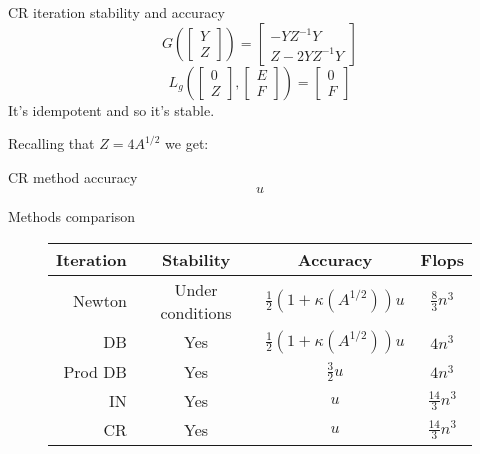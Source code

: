 \documentclass{beamer}
\theoremstyle{plain}
\theoremstyle{definition}
\theoremstyle{remark}
\newcommand{\pa}[1]{\left(#1\right)}
\newcommand{\bra}[1]{\left[#1\right]}
\begin{document}
\begin{frame}{CR iteration stability and accuracy}
  \[ G\pa{\bra{\begin{matrix}Y\\Z\end{matrix}}} = \bra{
      \begin{matrix}
        -YZ^{-1}Y  \\
        Z-2YZ^{-1}Y
      \end{matrix}} \]
  \[ L_g\pa{ \bra{ \begin{matrix}0\\Z\end{matrix}},
      \bra{\begin{matrix}E\\F\end{matrix}}} = \bra{\begin{matrix}0\\
        F \end{matrix}} \]
  It's idempotent and so it's stable. \vfill
  
  Recalling that $Z = 4A^{1/2}$ we get:
  \begin{block}{CR method accuracy}
    \[ u \]
  \end{block}
\end{frame}

\begin{frame}{Methods comparison}
  \begin{figure}
    \begin{tabular}{ r | c c >{\small}c }
      Iteration & Stability & Accuracy & Flops \\
      \hline
      Newton & Under conditions & $\frac{1}{2}\pa{1+ \kappa\pa{A^{1/2}}}u$ & $\frac{8}{3}n^3$ \\
      DB & Yes & $\frac{1}{2}\pa{1+ \kappa\pa{A^{1/2}}}u$ & $4n^3$ \\
      Prod DB & Yes & $\frac{3}{2}u$ & $4n^3$ \\
      IN & Yes & $u$ & $\frac{14}{3}n^3$ \\
      CR & Yes & $u$ & $\frac{14}{3}n^3$
    \end{tabular}
  \end{figure}
\end{frame}
\end{document}

